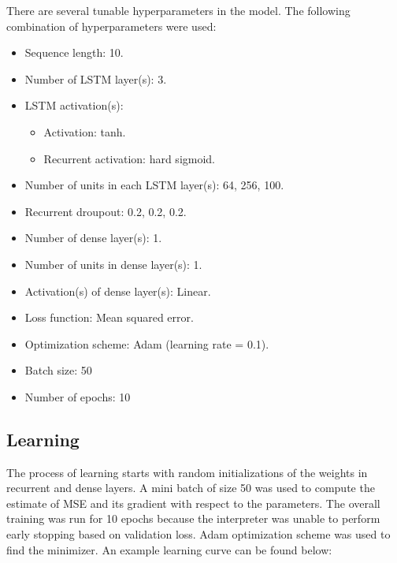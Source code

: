 \documentclass[%
aip,
amsmath,amssymb,
reprint,%
]{revtex4-1}
\begin{document}
There are several tunable hyperparameters in the model. The following combination of hyperparameters were used:

\begin{itemize}
  \item Sequence length: 10.
  \item Number of LSTM layer(s): 3.
  \item LSTM activation(s):
  \begin{itemize}
      \item Activation: tanh.
      \item Recurrent activation: hard sigmoid.
  \end{itemize}
  \item Number of units in each LSTM layer(s): 64, 256, 100.
  \item Recurrent droupout: 0.2, 0.2, 0.2.
  \item Number of dense layer(s): 1.
  \item Number of units in dense layer(s): 1.
  \item Activation(s) of dense layer(s): Linear.
  \item Loss function: Mean squared error.
  \item Optimization scheme: Adam (learning rate = 0.1).
  \item Batch size: 50
  \item Number of epochs: 10
\end{itemize}

\subsection{Learning}

The process of learning starts with random initializations of the weights in recurrent and dense layers. A mini batch of size 50 was used to compute the estimate of MSE and its gradient with respect to the parameters. The overall training was run for 10 epochs because the interpreter was unable to perform early stopping based on validation loss. Adam optimization scheme was used to find the minimizer. An example learning curve can be found below:
\end{document}
